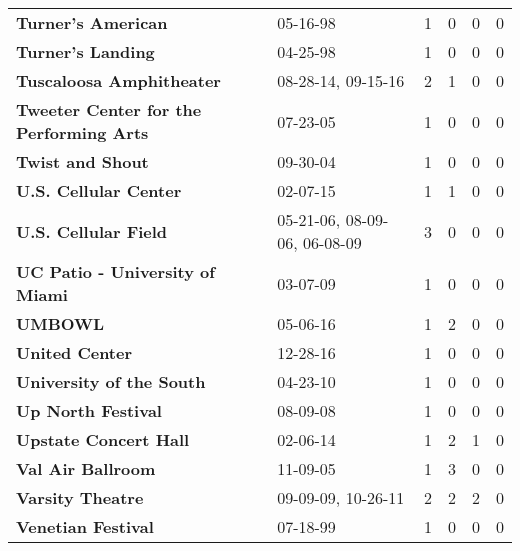 \begin{supertabular}{llllll}
                                           \textbf{Turner's American} &                      05-16-98 &  1 &   0 &  0 &  0 \\
                                            \textbf{Turner's Landing} &                      04-25-98 &  1 &   0 &  0 &  0 \\
                                     \textbf{Tuscaloosa Amphitheater} &            08-28-14, 09-15-16 &  2 &   1 &  0 &  0 \\
                      \textbf{Tweeter Center for the Performing Arts} &                      07-23-05 &  1 &   0 &  0 &  0 \\
                                             \textbf{Twist and Shout} &                      09-30-04 &  1 &   0 &  0 &  0 \\
                                        \textbf{U.S. Cellular Center} &                      02-07-15 &  1 &   1 &  0 &  0 \\
                                         \textbf{U.S. Cellular Field} &  05-21-06, 08-09-06, 06-08-09 &  3 &   0 &  0 &  0 \\
                              \textbf{UC Patio - University of Miami} &                      03-07-09 &  1 &   0 &  0 &  0 \\
                                                      \textbf{UMBOWL} &                      05-06-16 &  1 &   2 &  0 &  0 \\
                                               \textbf{United Center} &                      12-28-16 &  1 &   0 &  0 &  0 \\
                                     \textbf{University of the South} &                      04-23-10 &  1 &   0 &  0 &  0 \\
                                           \textbf{Up North Festival} &                      08-09-08 &  1 &   0 &  0 &  0 \\
                                        \textbf{Upstate Concert Hall} &                      02-06-14 &  1 &   2 &  1 &  0 \\
                                            \textbf{Val Air Ballroom} &                      11-09-05 &  1 &   3 &  0 &  0 \\
                                             \textbf{Varsity Theatre} &            09-09-09, 10-26-11 &  2 &   2 &  2 &  0 \\
                                           \textbf{Venetian Festival} &                      07-18-99 &  1 &   0 &  0 &  0 \\

\end{supertabular}
